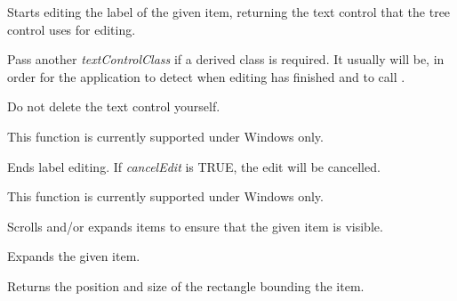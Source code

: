 \label{wxtreectrleditlabel}


Starts editing the label of the given item, returning the text control that the tree control uses for editing.

Pass another {\it textControlClass} if a derived class is required. It usually will be, in order for
the application to detect when editing has finished and to call .

Do not delete the text control yourself.

This function is currently supported under Windows only.



\label{wxtreectrlendeditlabel}


Ends label editing. If {\it cancelEdit} is TRUE, the edit will be cancelled.

This function is currently supported under Windows only.



\label{wxtreectrlensurevisible}


Scrolls and/or expands items to ensure that the given item is visible.

\label{wxtreectrlexpand}


Expands the given item.

\label{wxtreectrlgetitemrect}


Returns the position and size of the rectangle bounding the item.

